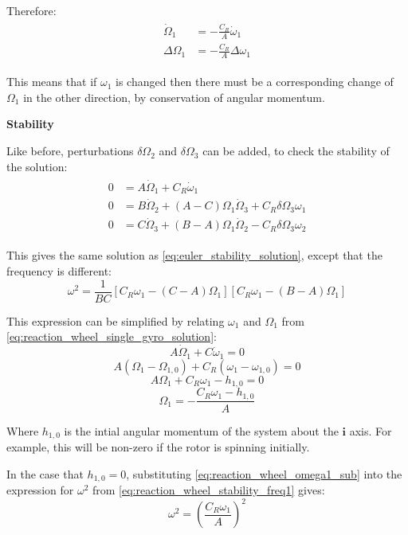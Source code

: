 \documentclass[12]{article}
\begin{document}
\begin{multicols*}{2}
Therefore:
\begin{align} \label{eq:reaction_wheel_single_gyro_solution}
\begin{split}
\dot{\Omega}_1 &= -\frac{C_R}{A}\dot{\omega}_1 \\
\Delta\Omega_1 &= -\frac{C_R}{A}\Delta\omega_1
\end{split}
\end{align}

This means that if $\omega_1$ is changed then there must be a corresponding change of $\Omega_1$ in the other direction, by conservation of angular momentum.

\textbf{Stability}

Like before, perturbations $\delta\Omega_2$ and $\delta\Omega_3$ can be added, to check the stability of the solution:
\begin{align} \label{eq:reaction_wheel_single_gyro_stability}
\begin{split}
0 &= A\dot{\Omega}_1 + C_R\dot{\omega}_1 \\
0 &= B\dot{\Omega}_2 + (A - C)\Omega_1\dot{\Omega}_3 + C_R\delta\Omega_3\omega_1 \\
0 &= C\dot{\Omega}_3 + (B - A)\Omega_1\dot{\Omega}_2 - C_R\delta\Omega_3\omega_2
\end{split}
\end{align}

This gives the same solution as \cref{eq:euler_stability_solution}, except that the frequency is different:
\begin{equation} \label{eq:reaction_wheel_stability_freq1}
\omega^2 = \frac{1}{BC}[C_R\omega_1 - (C-A)\Omega_1][C_R\omega_1 - (B-A)\Omega_1]
\end{equation}

This expression can be simplified by relating $\omega_1$ and $\Omega_1$ from \cref{eq:reaction_wheel_single_gyro_solution}:
$$ A\dot{\Omega}_1 + C\dot{\omega}_1 = 0 $$
$$ A(\Omega_1 - \Omega_{1,0}) + C_R(\omega_1 - \omega_{1,0}) = 0$$
$$ A\Omega_1 + C_R\omega_1 - h_{1,0} = 0 $$
\begin{equation} \label{eq:reaction_wheel_omega1_sub}
\Omega_1 = - \frac{C_R\omega_1 - h_{1,0}}{A}
\end{equation}

Where $h_{1,0}$ is the intial angular momentum of the system about the $\bm{i}$ axis. For example, this will be non-zero if the rotor is spinning initially.

In the case that $h_{1,0}=0$, substituting \cref{eq:reaction_wheel_omega1_sub} into the expression for $\omega^2$ from \cref{eq:reaction_wheel_stability_freq1} gives:
\begin{equation} \label{eq:reaction_wheel_stability_freq2}
\omega^2 = \left(\frac{C_R\omega_1}{A}\right)^2
\end{equation}


\end{multicols*}
\end{document}
